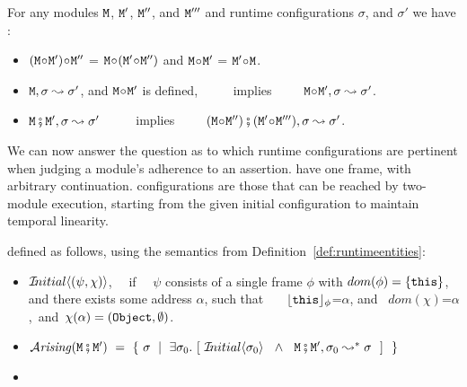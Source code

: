 \begin{lemma}
\label{lemma:linking}
 For any modules $\M$,   $\M'$, $\M''$, and $\M'''$ and runtime configurations $\sigma$, and $\sigma'$ we have$:$
 \label{lemma:linking:properties}

 \begin{itemize}
     \item
     $(\M \link \M')\link \M''$ = $\M \link (\M' \link \M'')$  \hspace{1cm} and    \hspace{1cm}   $\M \link \M'$  = $\M' \link\M$.
      \item
      $\M, \sigma \leadsto \sigma'$, and $\M\link \M'$ is defined, \  \ \ \ \  implies\ \ \ \ \   $\M\link \M', \sigma \leadsto \sigma'$.
 \item
 $\M \mkpair \M', \sigma \leadsto \sigma'$   \  \ \ \ \  implies\ \ \ \ \  $(\M\link\M'') \mkpair (\M'\link\M''') ,\sigma \leadsto \sigma'$.  
  \end{itemize}

 \end{lemma}
 
 We can now answer the question as to which runtime configurations are pertinent when judging a module's
adherence to an assertion.
 have one frame, with arbitrary continuation.
 configurations are  those that can be reached by two-module execution, starting from the given initial configuration to maintain temporal linearity.
 
\begin{definition} defined as follows, using the semantics from Definition~\ref{def:runtimeentities}: \label{def:arise}

\begin{itemize}
     \item
   $\Initial {(\psi,\chi)}$, \ \ if \ \ $\psi$ consists of a single frame $\phi$ with $dom(\phi)=\{ \this \}$, and there exists  some address $\alpha$, such that \ \ \    $\interp {\this}{\phi}$=$\alpha$, and \ $dom(\chi)$=$\alpha$,\  and\  
    $\chi(\alpha)=(\prg{Object},\emptyset)$.
 \item
\sout{ $\Arising  {\M\mkpair\M'} \ = \ \{ \ \sigma \ \mid \ \exists \sigma_0. \ [\  \Initial{\sigma_0} \  \ \wedge\ \  \M\mkpair\M', \sigma_0 \leadsto^* \sigma \ \ ] \ \ \} $}
 \item
 \end{itemize}

\end{definition}

